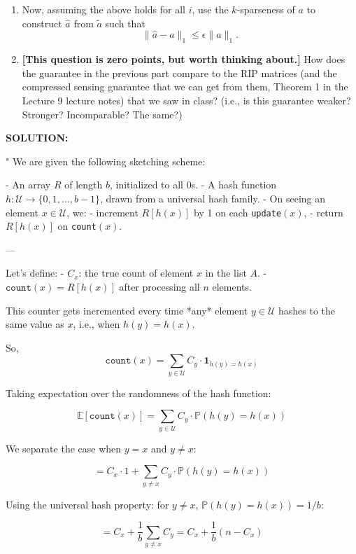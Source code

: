 \begin{enumerate}
\begin{enumerate}
\begin{enumerate}
\item {} Now, assuming the above holds for all $i$, use the $k$-sparseness of $a$ to construct $\hat{a}$ from $\tilde{a}$ such that
\[\|\hat{a} - a\|_1 \leq \epsilon \|a\|_1.\]


\item {} \textbf{[This question is zero points, but worth thinking about.]} How does the guarantee in the previous part compare to the RIP matrices (and the compressed sensing guarantee that we can get from them, Theorem 1 in the Lecture 9 lecture notes) that we saw in class?  (i.e., is this guarantee weaker?  Stronger?  Incomparable? The same?)


\end{enumerate}
\end{enumerate}
\ifdefined\template
\begin{shaded}
\textbf{SOLUTION:}
\ifdefined\sol


"
We are given the following sketching scheme:

- An array \( R \) of length \( b \), initialized to all 0s.
- A hash function \( h: \mathcal{U} \to \{0, 1, \dots, b-1\} \), drawn from a universal hash family.
- On seeing an element \( x \in \mathcal{U} \), we:
  - increment \( R[h(x)] \) by 1 on each \texttt{update}$(x)$,
  - return \( R[h(x)] \) on \texttt{count}$(x)$.

---

Let's define:
- \( C_x \): the true count of element \( x \) in the list \( A \).
- \( \texttt{count}(x) = R[h(x)] \) after processing all \( n \) elements.

This counter gets incremented every time *any* element \( y \in \mathcal{U} \) hashes to the same value as \( x \), i.e., when \( h(y) = h(x) \).

So,
\[
\texttt{count}(x) = \sum_{y \in \mathcal{U}} C_y \cdot \mathbf{1}_{h(y) = h(x)}
\]

Taking expectation over the randomness of the hash function:

\[
\mathbb{E}[\texttt{count}(x)] = \sum_{y \in \mathcal{U}} C_y \cdot \mathbb{P}(h(y) = h(x))
\]

We separate the case when \( y = x \) and \( y \ne x \):

\[
= C_x \cdot 1 + \sum_{y \ne x} C_y \cdot \mathbb{P}(h(y) = h(x))
\]

Using the universal hash property: for \( y \ne x \), \( \mathbb{P}(h(y) = h(x)) = 1/b \):

\[
= C_x + \frac{1}{b} \sum_{y \ne x} C_y = C_x + \frac{1}{b} (n - C_x)
\]


\end{shaded}
\end{enumerate}
